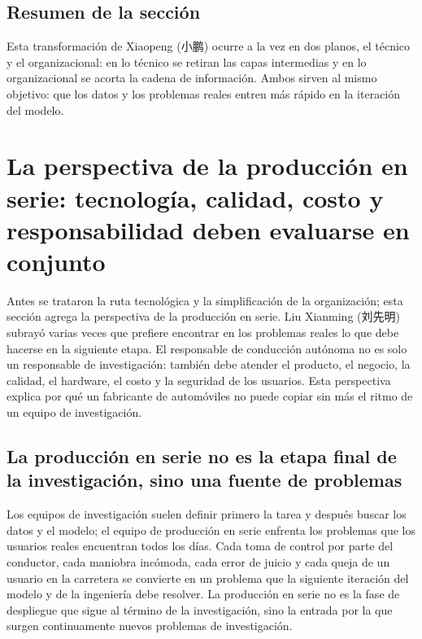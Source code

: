 \documentclass[a4paper]{article}
\begin{document}
\subsection{Resumen de la sección}

Esta transformación de Xiaopeng (小鹏) ocurre a la vez en dos planos, el técnico y el organizacional: en lo técnico se retiran las capas intermedias y en lo organizacional se acorta la cadena de información. Ambos sirven al mismo objetivo: que los datos y los problemas reales entren más rápido en la iteración del modelo.
\section{La perspectiva de la producción en serie: tecnología, calidad, costo y responsabilidad deben evaluarse en conjunto}

Antes se trataron la ruta tecnológica y la simplificación de la organización; esta sección agrega la perspectiva de la producción en serie. Liu Xianming (刘先明) subrayó varias veces que prefiere encontrar en los problemas reales lo que debe hacerse en la siguiente etapa. El responsable de conducción autónoma no es solo un responsable de investigación: también debe atender el producto, el negocio, la calidad, el hardware, el costo y la seguridad de los usuarios. Esta perspectiva explica por qué un fabricante de automóviles no puede copiar sin más el ritmo de un equipo de investigación.

\subsection{La producción en serie no es la etapa final de la investigación, sino una fuente de problemas}

Los equipos de investigación suelen definir primero la tarea y después buscar los datos y el modelo; el equipo de producción en serie enfrenta los problemas que los usuarios reales encuentran todos los días. Cada toma de control por parte del conductor, cada maniobra incómoda, cada error de juicio y cada queja de un usuario en la carretera se convierte en un problema que la siguiente iteración del modelo y de la ingeniería debe resolver. La producción en serie no es la fase de despliegue que sigue al término de la investigación, sino la entrada por la que surgen continuamente nuevos problemas de investigación.
\end{document}
